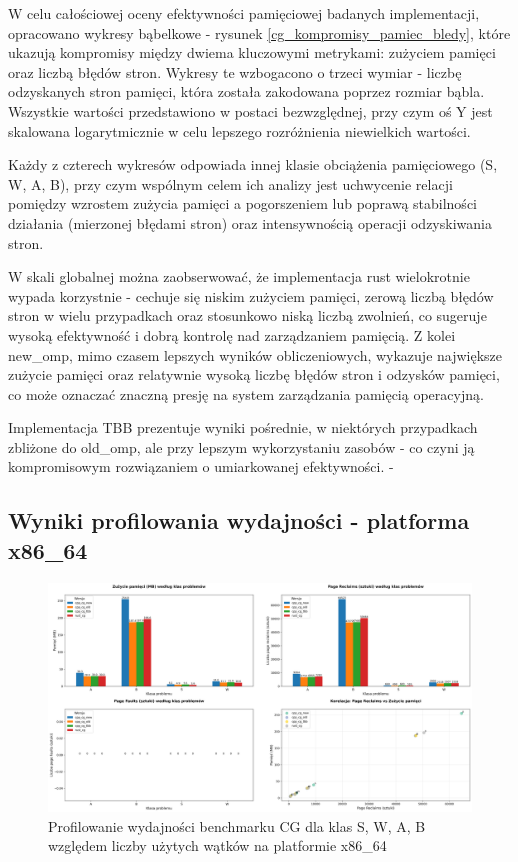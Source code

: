 W celu całościowej oceny efektywności pamięciowej badanych implementacji, opracowano wykresy bąbelkowe - rysunek \ref{cg_kompromisy_pamiec_bledy}, które ukazują kompromisy między dwiema kluczowymi metrykami: zużyciem pamięci oraz liczbą błędów stron. Wykresy te wzbogacono o trzeci wymiar - liczbę odzyskanych stron pamięci, która została zakodowana poprzez rozmiar bąbla. Wszystkie wartości przedstawiono w postaci bezwzględnej, przy czym oś Y jest skalowana logarytmicznie w celu lepszego rozróżnienia niewielkich wartości.

Każdy z czterech wykresów odpowiada innej klasie obciążenia pamięciowego (S, W, A, B), przy czym wspólnym celem ich analizy jest uchwycenie relacji pomiędzy wzrostem zużycia pamięci a pogorszeniem lub poprawą stabilności działania (mierzonej błędami stron) oraz intensywnością operacji odzyskiwania stron.

W skali globalnej można zaobserwować, że implementacja rust wielokrotnie wypada korzystnie - cechuje się niskim zużyciem pamięci, zerową liczbą błędów stron w wielu przypadkach oraz stosunkowo niską liczbą zwolnień, co sugeruje wysoką efektywność i dobrą kontrolę nad zarządzaniem pamięcią. Z kolei new\_omp, mimo czasem lepszych wyników obliczeniowych, wykazuje największe zużycie pamięci oraz relatywnie wysoką liczbę błędów stron i odzysków pamięci, co może oznaczać znaczną presję na system zarządzania pamięcią operacyjną.

Implementacja TBB prezentuje wyniki pośrednie, w niektórych przypadkach zbliżone do old\_omp, ale przy lepszym wykorzystaniu zasobów - co czyni ją kompromisowym rozwiązaniem o umiarkowanej efektywności.
-
\subsection{Wyniki profilowania wydajności - platforma x86\_64}
\begin{figure}[H]
    \centering
    \includegraphics[width=\textwidth]{analiza/images/parallel/cg/x86/chart_01_memory_comparison.png}
    \caption{Profilowanie wydajności benchmarku CG dla klas S, W, A, B względem liczby użytych wątków na platformie x86\_64}
    \label{cg_porownanie_zuzycia_pamieci_x86_64}
\end{figure}
